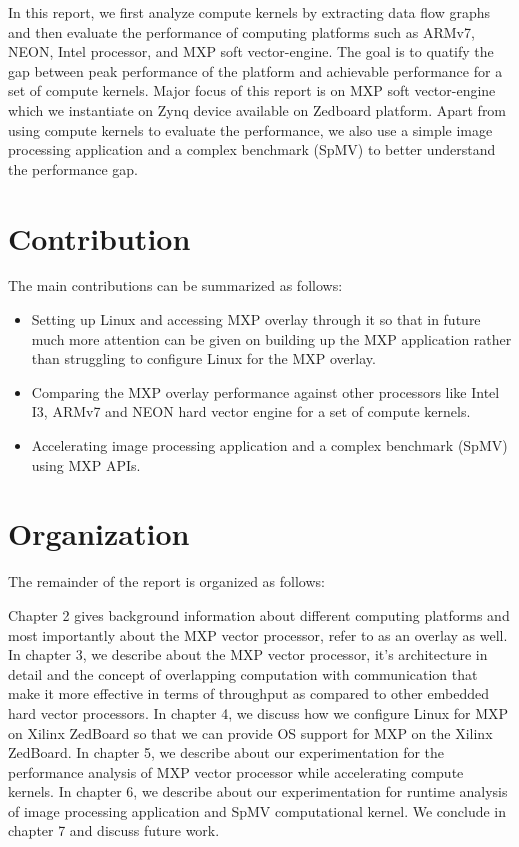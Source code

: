 In this report, we first analyze compute kernels by extracting data flow graphs and then evaluate the performance of computing platforms such as ARMv7, NEON, Intel processor, and MXP soft vector-engine. The goal is to quatify the gap between peak performance of the platform and achievable performance for a set of compute kernels. 
Major focus of this report is on MXP soft vector-engine which we instantiate on Zynq device available on Zedboard platform.
Apart from using compute kernels to evaluate the performance, we also use a simple image processing application and a complex benchmark (SpMV) to better understand the performance gap.





\section{Contribution}
The main contributions can be summarized as follows:

\begin{itemize}
	\item Setting up Linux and accessing MXP overlay through it so that in future much more attention can be given on building up the MXP application rather than struggling to configure Linux for the MXP overlay.
	\item Comparing the MXP overlay performance against other processors like Intel I3, ARMv7 and NEON hard vector engine for a set of compute kernels.
	\item Accelerating image processing application and a complex benchmark (SpMV) using MXP APIs.
\end{itemize}

\section{Organization}
The remainder of the report is organized as follows:

Chapter 2 gives background information about different computing platforms and most importantly about the MXP vector processor, refer to as an overlay as well. In chapter 3, we describe about the MXP vector processor, it's architecture in detail and the concept of overlapping computation with communication that make it more effective in terms of throughput as compared to other embedded hard vector processors. In chapter 4, we discuss how we configure Linux for MXP on Xilinx ZedBoard so that we can provide OS support for MXP on the Xilinx ZedBoard. In chapter 5, we describe about our experimentation for the performance analysis of MXP vector processor while accelerating compute kernels. In chapter 6, we describe about our experimentation for runtime analysis of image processing application and SpMV computational kernel. We conclude in chapter 7 and discuss future work.








